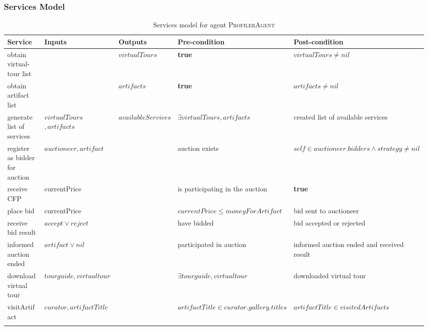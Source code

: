 \documentclass[paper=letter, fontsize=12pt]{article}
\begin{document}
\subsubsection{Services Model}
\begin {table}[H]
\caption {Services model for agent \textsc{ProfilerAgent}} \label{tab:profilerAgent} 
\begin{center}
    \begin{tabular}{  p{3cm}  p{2cm}  p{2.5cm}  p{4cm}  p{4cm} }
\Xhline{4\arrayrulewidth}
    Service & Inputs & Outputs & Pre-condition & Post-condition\\ \hline
obtain virtual-tour list & & $virtualTours$ & \textbf{true} & $virtualTours \neq nil$ \\
obtain artifact list & & $artifacts$ & \textbf{true} & $artifacts \neq nil$ \\
generate list of services & $virtualTours$ $,artifacts$ & $availableServices$ & $\exists virtualTours, artifacts$ & created list of available services\\
register as bidder for auction & $auctioneer, artifact$ & & auction exists & $self \in auctioneer.bidders \land strategy \neq nil$ \\
receive CFP & currentPrice & & is participating in the auction &  \textbf{true}\\
place bid & currentPrice & & $currentPrice \leq moneyForArtifact$ & bid sent to auctioneer\\
receive bid result & $accept \lor reject$ & & have bidded & bid accepted or rejected\\
informed auction ended & $artifact \lor nil$ & & participated in auction & informed auction ended and received result\\
download virtual tour & $tourguide, virtualtour$ & & $\exists tourguide, virtualtour$ & downloaded virtual tour\\
visitArtifact & $curator, artifactTitle$ & & $artifactTitle \in curator.gallery.titles$ & $artifactTitle \in visitedArtifacts$\\
\Xhline{4\arrayrulewidth}
    \end{tabular}
\end{center}
\end{table}
\end{document}
